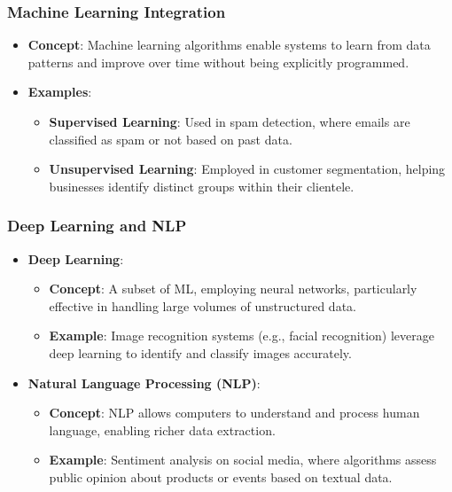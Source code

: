 \documentclass{beamer}
\begin{document}
\begin{frame}[fragile]
    \frametitle{Machine Learning Integration}
    \begin{itemize}
        \item \textbf{Concept}: Machine learning algorithms enable systems to learn from data patterns and improve over time without being explicitly programmed.
        \item \textbf{Examples}:
        \begin{itemize}
            \item \textbf{Supervised Learning}: Used in spam detection, where emails are classified as spam or not based on past data.
            \item \textbf{Unsupervised Learning}: Employed in customer segmentation, helping businesses identify distinct groups within their clientele.
        \end{itemize}
    \end{itemize}
\end{frame}

\begin{frame}[fragile]
    \frametitle{Deep Learning and NLP}
    \begin{itemize}
        \item \textbf{Deep Learning}:
        \begin{itemize}
            \item \textbf{Concept}: A subset of ML, employing neural networks, particularly effective in handling large volumes of unstructured data.
            \item \textbf{Example}: Image recognition systems (e.g., facial recognition) leverage deep learning to identify and classify images accurately.
        \end{itemize}
        
        \item \textbf{Natural Language Processing (NLP)}:
        \begin{itemize}
            \item \textbf{Concept}: NLP allows computers to understand and process human language, enabling richer data extraction.
            \item \textbf{Example}: Sentiment analysis on social media, where algorithms assess public opinion about products or events based on textual data.
        \end{itemize}
    \end{itemize}
\end{frame}
\end{document}
